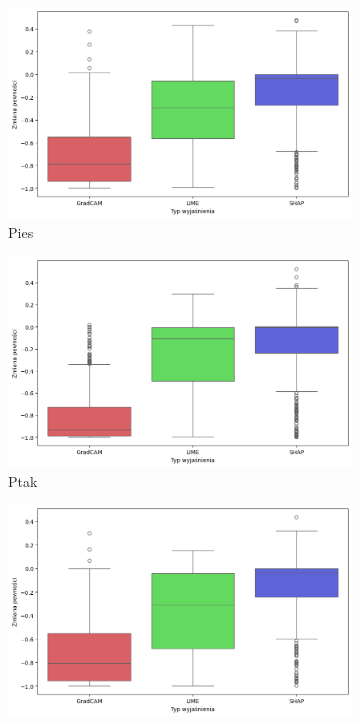 \begin{figure}[h]
	\centering
	\begin{subfigure}[b]{0.3\textwidth}
		\includegraphics[width=.9\textwidth]{img/base_confidence_no_exp_dog}
		\caption{Pies}  \label{rys:base_confidence_no_exp_dog}
	\end{subfigure}
	\begin{subfigure}[b]{0.3\textwidth}
		\centering\includegraphics[width=.9\textwidth]{img/base_confidence_no_exp_bird}
		\caption{Ptak}  \label{rys:base_confidence_no_exp_bird}
	\end{subfigure}
	\begin{subfigure}[b]{0.3\textwidth}
		\centering\includegraphics[width=.9\textwidth]{img/base_confidence_no_exp_vehicle}

\end{subfigure}
\end{figure}
